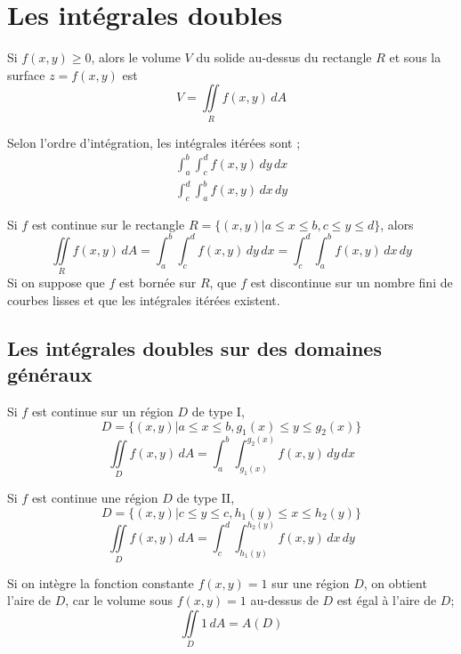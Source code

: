 \section{Les intégrales doubles}
	\begin{mydef}
	Si $f(x,y)\geq 0$, alors le volume $V$ du solide au-dessus du rectangle $R$ et sous la surface $z=f(x,y)$ est \[V=\iint\limits_R f(x,y)\, dA\]
\end{mydef}
	\begin{mydef}
		Selon l'ordre d'intégration, les intégrales itérées sont ;
		\begin{gather}
			\int_a^b\int_c^d f(x,y)\, dy\, dx\\
			\int_c^d\int_a^b f(x,y)\, dx\, dy
		\end{gather}
	\end{mydef}
	\begin{mythm}
		Si $f$ est continue sur le rectangle $R=\big\{(x,y) \lvert a\leq x \leq b, c\leq y \leq d  \big\}$, alors 
			\[\iint\limits_R f(x,y)\, dA=\int_a^b\int_c^d f(x,y)\, dy\, dx=	\int_c^d\int_a^b f(x,y)\, dx\, dy\]
		Si on suppose que $f$ est bornée sur $R$, que $f$ est discontinue sur un nombre fini de courbes lisses et que les intégrales itérées existent.
	\end{mythm}
	\subsection{Les intégrales doubles sur des domaines généraux}
		\begin{mydef}
			Si $f$ est continue sur un région $D$ de type I,
				\[D=\big\{(x,y)\lvert a\leq x\leq b, g_1(x)\leq y\leq g_2(x)\big\}\]
				\[\iint\limits_D f(x,y)\, dA = \int_a^b\int_{g_1(x)}^{g_2(x)} f(x,y)\, dy\, dx\]
		\end{mydef}
		\begin{mydef}
			Si $f$ est continue une région $D$ de type II,
				\[D=\big\{(x,y)\lvert c\leq y\leq c, h_1(y)\leq x\leq h_2(y)\big\}\]
			\[\iint\limits_D f(x,y)\, dA = \int_c^d\int_{h_1(y)}^{h_2(y)} f(x,y)\, dx\, dy\]
		\end{mydef}
		\begin{myprop}
		Si on intègre la fonction constante $f(x,y)=1$ sur une région $D$, on obtient l'aire de $D$, car le volume sous $f(x,y)=1$ au-dessus de $D$ est égal à l'aire de $D$;\[\iint\limits_D 1\, dA=A(D)\]
	\end{myprop}
